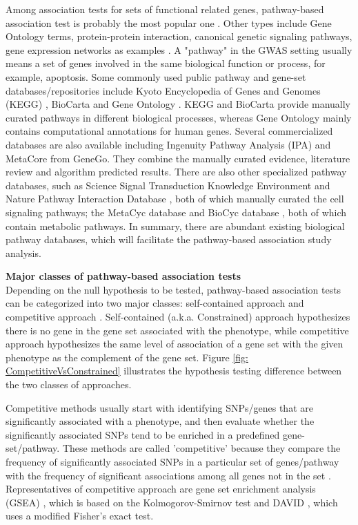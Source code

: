 \documentclass[12pt]{article}
\begin{document}
Among association tests for sets of functional related genes, pathway-based association test is probably the most popular one \cite{DelaCruz2010,Wang2010}. Other types include Gene Ontology terms, protein-protein interaction, canonical genetic signaling pathways, gene expression networks as examples \cite{Sham2014,DelaCruz2010,Weng2011,Wang2010}. A "pathway" in the GWAS setting usually means a set of genes involved in the same biological function or process, for example, apoptosis. Some commonly used public pathway and gene-set databases/repositories include Kyoto Encyclopedia of Genes and Genomes (KEGG) \cite{Ogata1999}, BioCarta \cite{Nishimura2001} and Gene Ontology \cite{Ashburner2000}. KEGG and BioCarta provide manually curated pathways in different biological processes, whereas Gene Ontology mainly contains computational annotations for human genes. Several commercialized databases are also available including Ingenuity Pathway Analysis (IPA) and MetaCore from GeneGo. They combine the manually curated evidence, literature review and algorithm predicted results. There are also other specialized pathway databases,
such as Science Signal Transduction Knowledge Environment \cite{Gough2002} and Nature Pathway Interaction Database \cite{Schaefer2009}, both of which manually curated the cell signaling pathways; the MetaCyc database \cite{Karp2002} and BioCyc database \cite{Caspi2008}, both of which contain metabolic pathways. In summary, there are abundant existing biological pathway databases, which will facilitate the pathway-based association study analysis.

\textbf{Major classes of pathway-based association tests}\\
Depending on the null hypothesis to be tested, pathway-based association tests can be categorized into two major classes: self-contained approach and competitive approach \cite{Goeman2007,Liu2007,Nam2008,Wang2010,Fridley2010,Fridley2011}. Self-contained (a.k.a. Constrained) approach hypothesizes there is no gene in the gene set associated with the phenotype, while competitive approach hypothesizes the same level of association of a gene set with the given phenotype as the complement of the gene set.  Figure \ref{fig: CompetitiveVsConstrained} illustrates the hypothesis testing difference between the two classes of approaches.  

Competitive methods usually start with identifying SNPs/genes that are significantly associated with a phenotype, and then evaluate whether the significantly associated SNPs tend to be enriched in a predefined gene-set/pathway. These methods are called 'competitive' because they compare the frequency of significantly associated SNPs in a particular set of genes/pathway with the frequency of significant associations among all genes not in the set \cite{Fridley2011}. Representatives of competitive approach are gene set enrichment analysis (GSEA) \cite{Subramanian2005}, which is based on the Kolmogorov-Smirnov test and DAVID \cite{DennisJr2003}, which uses a modified Fisher's exact test.
\end{document}
